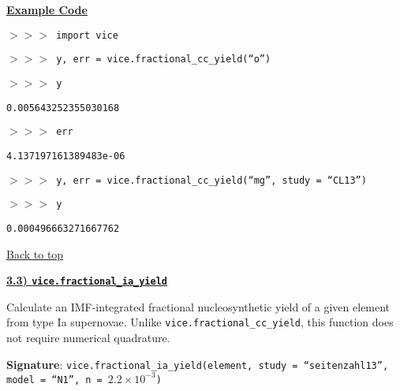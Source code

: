 \documentclass{report}
\begin{document}
\par\null\par\noindent 
\underline{\textbf{Example Code}} 
\par\noindent 
\texttt{$>>>$ import vice} \par\noindent 
\texttt{$>>>$ y, err = vice.fractional\_cc\_yield(``o'')} \par\noindent 
\texttt{$>>>$ y} \par\noindent 
\texttt{0.005643252355030168} \par\noindent 
\texttt{$>>>$ err} \par\noindent 
\texttt{4.137197161389483e-06} \par\noindent 
\texttt{$>>>$ y, err = vice.fractional\_cc\_yield(``mg'', study = ``CL13'')} 
\par\noindent 
\texttt{$>>>$ y} \par\noindent 
\texttt{0.000496663271667762} \par\noindent 

\vfill 
\hyperlink{top}{Back to top}
\clearpage 

\newpage 
\noindent 
\begin{center}
\hypertarget{func:fractional_ia_yield}{
	\underline{\LARGE 
		\textbf{3.3) \texttt{vice.fractional\_ia\_yield}}
	}
}
\end{center}
\par\noindent 
Calculate an IMF-integrated fractional nucleosynthetic yield of a given element 
from type Ia supernovae. Unlike \texttt{vice.fractional\_cc\_yield}, this 
function does not require numerical quadrature. 

\par\null\par\noindent 
\textbf{Signature}: \texttt{vice.fractional\_ia\_yield(element, 
	study = ``seitenzahl13'', model = ``N1'', n = $2.2\times10^{-3}$)} 
\end{document}
